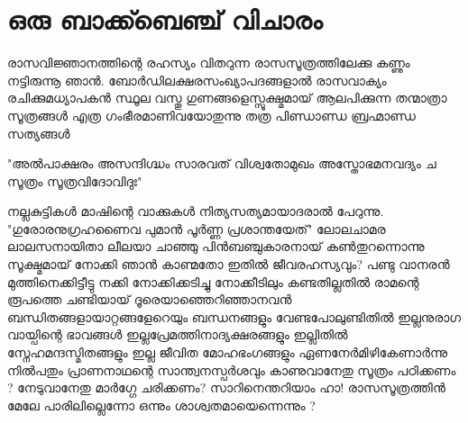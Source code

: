 \section{ഒരു ബാക്ക്ബെഞ്ച് വിചാരം}
\obeylines
\noindent
രാസവിജ്ഞാനത്തിന്റെ രഹസ്യം വിതറുന്ന
രാസസൂത്രത്തിലേക്കു കണ്ണും നട്ടിരുന്നൂ ഞാൻ.
ബോർഡിലക്ഷരസംഖ്യാപദങ്ങളാൽ
രാസവാക്യം രചിക്കുമധ്യാപകൻ
സ്ഥൂല വസ്തു ഗുണങ്ങളെസ്സൂക്ഷ്മമായ്
ആലപിക്കുന്ന തന്മാത്രാ സൂത്രങ്ങൾ
എത്ര ഗംഭീരമാണിവയോതുന്നു
തത്ര പിണ്ഡാണ്ഡ ബ്രഹ്മാണ്ഡ സത്യങ്ങൾ 
\begin{center}
"അൽപാക്ഷരം അസന്ദിഗ്ദ്ധം 
സാരവത് വിശ്വതോമുഖം 
അസ്തോഭമനവദ്യം ച 
സൂത്രം സൂത്രവിദോവിദുഃ"
\end{center}
\noindent
നല്ലകുട്ടികൾ മാഷിന്റെ വാക്കുകൾ 
നിത്യസത്യമായാദരാൽ പേറുന്നു.
"ഗുരോരനുഗ്രഹണൈവ പുമാൻ പൂർണ്ണ പ്രശാന്തയേത്" 
ലോലചാമര ലാലസനായിതാ 
ലീലയാ ചാഞ്ഞു പിൻബഞ്ചുകാരനായ് 
കൺതുറന്നൊന്നു സൂക്ഷ്മമായ് നോക്കി ഞാൻ 
കാണ്മതോ ഇതിൽ ജീവരഹസ്യവും? 
പണ്ടു വാനരൻ മുത്തിനെക്കിട്ടീട്ടു 
നക്കി നോക്കിക്കടിച്ചു നോക്കീടിലും 
കണ്ടതില്ലതിൽ രാമന്റെ രൂപത്തെ 
ചണ്ടിയായ് ദൂരെയാഞ്ഞെറിഞ്ഞാനവൻ 
ബന്ധിതങ്ങളായാറ്റങ്ങളേറെയും 
ബന്ധനങ്ങളും വേണ്ടപോലുണ്ടിതിൽ 
ഇല്ലനുരാഗ വായ്പിന്റെ ഭാവങ്ങൾ 
ഇല്ലപ്രേമത്തിനാദ്യക്ഷരങ്ങളും 
ഇല്ലിതിൽ സ്നേഹമന്ദസ്മിതങ്ങളും 
ഇല്ല ജീവിത മോഹഭംഗങ്ങളും 
ഏണനേർമിഴികേണാർന്നു നിൽപതും 
പ്രാണനാഥന്റെ സാന്ത്വനസ്പർശവും 
കാണുവാനേതു സൂത്രം പഠിക്കണം ?
നേടുവാനേതു മാർഗ്ഗേ ചരിക്കണം?
സാറിനെന്തറിയാം ഹാ! രാസസൂത്രത്തിൻ മേലേ 
പാരിലില്ലെന്നോ ഒന്നും ശാശ്വതമായെന്നെന്നും ?
